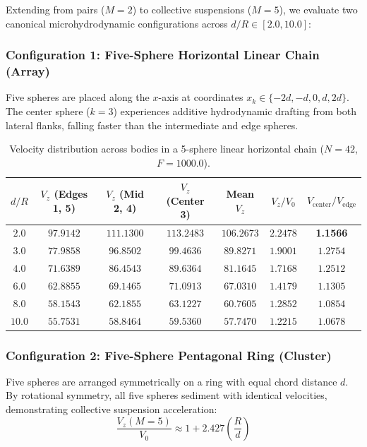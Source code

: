 \documentclass[11pt,a4paper]{article}
\begin{document}
Extending from pairs ($M = 2$) to collective suspensions ($M = 5$), we evaluate two canonical microhydrodynamic configurations across $d/R \in [2.0, 10.0]$:

\subsubsection{Configuration 1: Five-Sphere Horizontal Linear Chain (Array)}
Five spheres are placed along the $x$-axis at coordinates $x_k \in \{-2d, -d, 0, d, 2d\}$. The center sphere ($k = 3$) experiences additive hydrodynamic drafting from both lateral flanks, falling faster than the intermediate and edge spheres.

\begin{table}[htbp]
\centering
\caption{Velocity distribution across bodies in a 5-sphere linear horizontal chain ($N = 42$, $F = 1000.0$).}
\label{tab:sphere_5body_chain}
\begin{tabular}{ccccccc}
\toprule
$d/R$ & $V_z$ (Edges 1, 5) & $V_z$ (Mid 2, 4) & $V_z$ (Center 3) & Mean $V_z$ & $V_z / V_0$ & $V_{\text{center}} / V_{\text{edge}}$ \\
\midrule
$2.0$  & $97.9142$ & $111.1300$ & $113.2483$ & $106.2673$ & $2.2478$ & \textbf{1.1566} \\
$3.0$  & $77.9858$ & $96.8502$  & $99.4636$  & $89.8271$  & $1.9001$ & $1.2754$ \\
$4.0$  & $71.6389$ & $86.4543$  & $89.6364$  & $81.1645$  & $1.7168$ & $1.2512$ \\
$6.0$  & $62.8855$ & $69.1465$  & $71.0913$  & $67.0310$  & $1.4179$ & $1.1305$ \\
$8.0$  & $58.1543$ & $62.1855$  & $63.1227$  & $60.7605$  & $1.2852$ & $1.0854$ \\
$10.0$ & $55.7531$ & $58.8464$  & $59.5360$  & $57.7470$  & $1.2215$ & $1.0678$ \\
\bottomrule
\end{tabular}
\end{table}

\subsubsection{Configuration 2: Five-Sphere Pentagonal Ring (Cluster)}
Five spheres are arranged symmetrically on a ring with equal chord distance $d$. By rotational symmetry, all five spheres sediment with identical velocities, demonstrating collective suspension acceleration:
\begin{equation}
    \frac{V_z(M=5)}{V_0} \approx 1 + 2.427 \left(\frac{R}{d}\right)
\end{equation}
\end{document}
